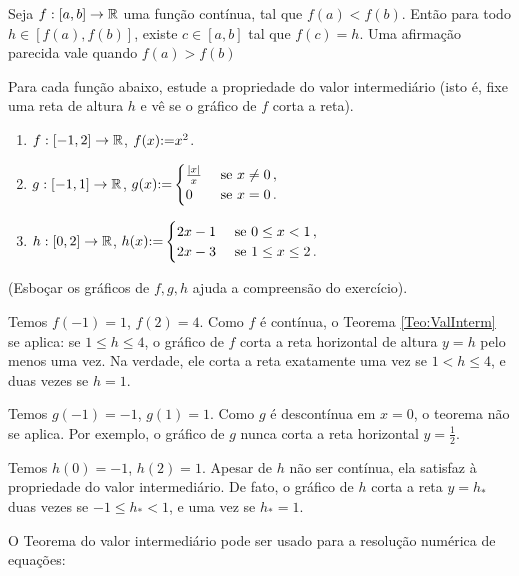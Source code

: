 \begin{teo}\label{Teo:ValInterm}
Seja  $f:[a,b]\to \mathbb{R}$ uma função contínua, tal que $f(a)<f(b)$. 
Então para todo $h\in [f(a),f(b)]$, existe $c\in [a,b]$ tal que
$f(c)=h$. Uma afirmação parecida vale quando $f(a)>f(b)$
\end{teo}

\begin{exo}
Para cada função abaixo, estude a propriedade do valor
intermediário (isto é, fixe uma reta de altura $h$ e vê se o gráfico de $f$
corta a reta).
\begin{enumerate}
\item $f:[-1,2]\to \mathbb{R}$, $f(x){:=} x^2$.
\item $g:[-1,1]\to \mathbb{R}$, 
$g(x){:=}
\begin{cases}
\frac{|x|}{x}&\text{ se }x\neq 0\,,\\
0&\text{ se }x=0\,.\\
\end{cases}
$
\item $h:[0,2]\to \mathbb{R}$, 
$h(x){:=}
\begin{cases}
2x-1&\text{ se }0\leq x<1\,,\\
2x-3&\text{ se }1\leq x\leq 2\,.\\
\end{cases}
$
\end{enumerate}
\begin{sol}
(Esboçar os gráficos de $f,g,h$ ajuda a compreensão do exercício).

Temos $f(-1)=1$, $f(2)=4$.
Como $f$ é contínua, o Teorema \eqref{Teo:ValInterm} se aplica:
se $1\leq h\leq 4$, o gráfico de $f$ corta a reta horizontal de
altura $y=h$ pelo menos uma vez. Na verdade, ele corta a reta
exatamente uma vez se $1<h\leq 4$, e duas vezes se $h=1$.

Temos $g(-1)=-1$, $g(1)=1$. 
Como $g$ é descontínua em $x=0$, o teorema não se aplica. Por
exemplo, o gráfico de $g$ nunca corta a reta horizontal $y=\frac12$.

Temos $h(0)=-1$, $h(2)=1$. Apesar de $h$ não ser contínua, ela
satisfaz à propriedade do valor intermediário. De fato, o gráfico de
$h$ corta a reta $y=h_*$ duas vezes se $-1\leq h_*<1$, e uma vez se $h_*=1$.
\end{sol}
\end{exo}

O Teorema do valor intermediário pode ser usado para 
a resolução numérica de equações:

